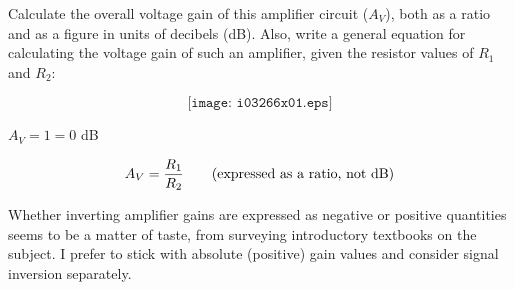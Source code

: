 

Calculate the overall voltage gain of this amplifier circuit ($A_V$), both as a ratio and as a figure in units of decibels (dB).  Also, write a general equation for calculating the voltage gain of such an amplifier, given the resistor values of $R_1$ and $R_2$:

$$\texttt{[image: i03266x01.eps]}$$







$A_V = 1 = 0$ dB 

$$A_V = {R_1 \over R_2} \hbox{\hskip 20pt (expressed as a ratio, not dB)}$$







Whether inverting amplifier gains are expressed as negative or positive quantities seems to be a matter of taste, from surveying introductory textbooks on the subject.  I prefer to stick with absolute (positive) gain values and consider signal inversion separately.




